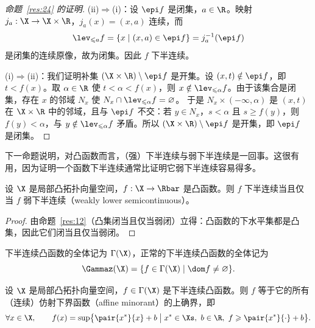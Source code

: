 \begin{proof}[命题~\ref{res:24} 的证明]
(ii)$\Rightarrow$(i)：设 $\epi f$ 是闭集，$a\in\R$。映射 $j_a:\X\to\X\times\R$，$j_a(x)=(x,a)$ 连续，而
\[
  \lev_{\leqslant a}f=\{x \mid (x,a)\in\epi f\}=j_a^{-1}(\epi f)
\]
是闭集的连续原像，故为闭集。因此 $f$ 下半连续。

(i)$\Rightarrow$(ii)：我们证明补集 $(\X\times\R)\setminus\epi f$ 是开集。设 $(x,t)\notin\epi f$，即 $t<f(x)$。取 $\alpha\in\R$ 使 $t<\alpha<f(x)$，则 $x\notin\lev_{\leqslant\alpha}f$。由于该集合是闭集，存在 $x$ 的邻域 $N_x$ 使 $N_x\cap\lev_{\leqslant\alpha}f=\varnothing$。
于是 $N_x\times(-\infty,\alpha)$ 是 $(x,t)$ 在 $\X\times\R$ 中的邻域，且与 $\epi f$ 不交：若 $y\in N_x$，$s<\alpha$ 且 $s\geqslant f(y)$，则 $f(y)<\alpha$，与 $y\notin\lev_{\leqslant\alpha}f$ 矛盾。所以 $(\X\times\R)\setminus\epi f$ 是开集，即 $\epi f$ 是闭集。
\end{proof}

下一命题说明，对凸函数而言，（强）下半连续与弱下半连续是一回事。这很有用，因为证明一个函数下半连续通常比证明它弱下半连续容易得多。

\begin{proposition}
\label{res:25}
设 $\X$ 是局部凸拓扑向量空间，$f:\X\to\Rbar$ 是凸函数。则 $f$ 下半连续当且仅当 $f$ 弱下半连续（weakly lower semicontinuous）。
\end{proposition}

\begin{proof}
由命题~\ref{res:12}（凸集闭当且仅当弱闭）立得：凸函数的下水平集都是凸集，因此它们闭当且仅当弱闭。
\end{proof}

\begin{definition}[下半连续凸函数类]
\label{def:16}
下半连续凸函数的全体记为 $\Gamma(\X)$，正常的下半连续凸函数的全体记为
\[
  \Gammaz(\X)=\{f\in\Gamma(\X) \mid \dom f\neq\varnothing\}.
\]
\end{definition}

\begin{proposition}
\label{res:26}
设 $\X$ 是局部凸拓扑向量空间，$f\in\Gamma(\X)$ 是下半连续凸函数。则 $f$ 等于它的所有（连续）仿射下界函数（affine minorant）的上确界，即
\[
  \forall x\in\X,\qquad f(x)=\sup\bigl\{\pair{x^*}{x}+b \bigm| x^*\in\Xs,\ b\in\R,\ f\geqslant\pair{x^*}{\cdot}+b\bigr\}.
\]
\end{proposition}

